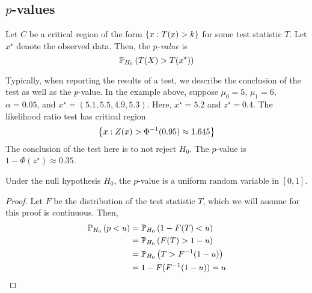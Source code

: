 \subsection{\( p \)-values}
\begin{definition}
	Let \( C \) be a critical region of the form \( \qty{ x: T(x) > k } \) for some test statistic \( T \).
	Let \( x^\star \) denote the observed data.
	Then, the \textit{\( p \)-value} is
	\[
		\mathbb{P}_{H_0}\left({T(X) > T(x^\star)}\right)
	\]
\end{definition}
Typically, when reporting the results of a test, we describe the conclusion of the test as well as the \( p \)-value.
In the example above, suppose \( \mu_0 = 5 \), \( \mu_1 = 6 \), \( \alpha = 0.05 \), and \( x^\star = (5.1, 5.5, 4.9, 5.3) \).
Here, \( \overline{x^\star} = 5.2 \) and \( z^\star = 0.4 \).
The likelihood ratio test has critical region
\[
	\qty{x: Z(x) > \Phi^{-1}(0.95) \approx 1.645}
\]
The conclusion of the test here is to not reject \( H_0 \).
The \( p \)-value is \( 1 - \Phi(z^\star) \approx 0.35 \).
\begin{proposition}
	Under the null hypothesis \( H_0 \), the \( p \)-value is a uniform random variable in \( [0,1] \).
\end{proposition}
\begin{proof}
	Let \( F \) be the distribution of the test statistic \( T \), which we will assume for this proof is continuous.
	Then,
	\begin{align*}
		\mathbb{P}_{H_0}\left({p < u}\right) & = \mathbb{P}_{H_0}\left({1 - F(T) < u}\right)    \\
		                  & = \mathbb{P}_{H_0}\left({F(T) > 1-u}\right)      \\
		                  & = \mathbb{P}_{H_0}\left({T > F^{-1}(1-u)}\right) \\
		                  & = 1 - F(F^{-1}(1-u)) = u
	\end{align*}
\end{proof}

